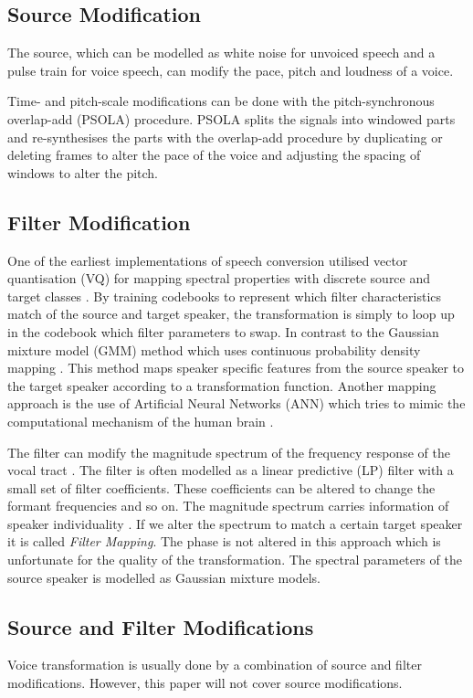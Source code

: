 \subsection{Source Modification} %
\label{sub:source_modification}
The source, which can be modelled as white noise for unvoiced speech and a pulse train for voice speech, can modify the pace, pitch and loudness of a voice. 

Time- and pitch-scale modifications can be done with the pitch-synchronous overlap-add (PSOLA) procedure. PSOLA splits the signals into windowed parts and re-synthesises the parts with the overlap-add procedure by duplicating or deleting frames to alter the pace of the voice and adjusting the spacing of windows to alter the pitch.

\subsection{Filter Modification} %
\label{sub:filter_modification}
One of the earliest implementations of speech conversion utilised vector quantisation (VQ) for mapping spectral properties with discrete source and target classes \cite{abe88}. By training codebooks to represent which filter characteristics match of the source and target speaker, the transformation is simply to loop up in the codebook which filter parameters to swap. In contrast to the Gaussian mixture model (GMM) method which uses continuous probability density mapping \cite{stylianou98}. This method maps speaker specific features from the source speaker to the target speaker according to a transformation function. Another mapping approach is the use of Artificial Neural Networks (ANN) \cite{desai09} which tries to mimic the computational mechanism of the human brain \cite{young75}.

The filter can modify the magnitude spectrum of the frequency response of the vocal tract \cite{nguyen09}. The filter is often modelled as a linear predictive (LP) filter with a small set of filter coefficients. These coefficients can be altered to change the formant frequencies and so on. The magnitude spectrum carries information of speaker individuality \cite{stylianou09}. If we alter the spectrum to match a certain target speaker it is called \emph{Filter Mapping}. The phase is not altered in this approach which is unfortunate for the quality of the transformation. The spectral parameters of the source speaker is modelled as Gaussian mixture models.

\subsection{Source and Filter Modifications} %
\label{sub:source_and_filter_modifications}
Voice transformation is usually done by a combination of source and filter modifications. However, this paper will not cover source modifications.

